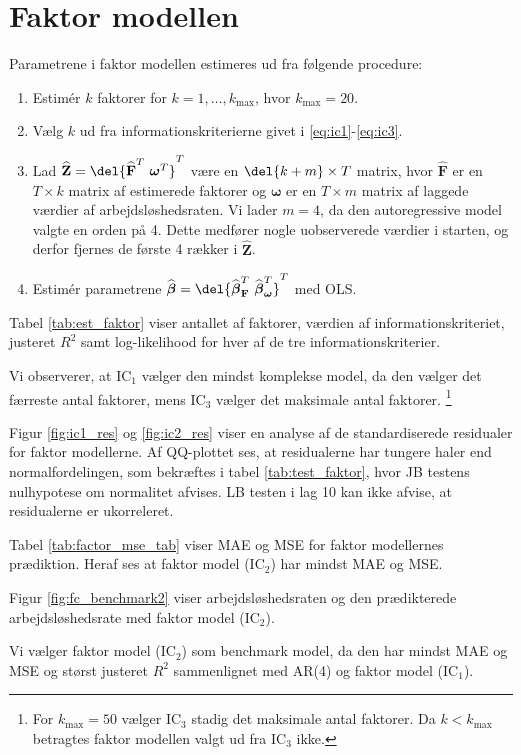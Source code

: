 \section{Faktor modellen}
Parametrene i faktor modellen estimeres ud fra følgende procedure:
\begin{enumerate}
\item Estimér $k$ faktorer for $k = 1, \dots, k_{\max}$, hvor $k_{\max} = 20$.  
\item Vælg $k$ ud fra informationskriterierne givet i \eqref{eq:ic1}-\eqref{eq:ic3}.
\item Lad \(\widehat{\textbf{Z}} = \del{\widehat{{\textbf{F}}}^T \ \boldsymbol{\omega}^T}^T\) være en \(\del{k+m} \times T\) matrix, hvor \(\widehat{{\textbf{F}}}\) er en \(T \times k\) matrix af estimerede faktorer og \(\boldsymbol{\omega}\) er en \(T \times m\) matrix af laggede værdier af arbejdsløshedsraten.
Vi lader \(m = 4\), da den autoregressive model valgte en orden på 4.
Dette medfører nogle uobserverede værdier i starten, og derfor fjernes de første 4 rækker i \(\widehat{\textbf{Z}}\).
\item Estimér parametrene $\widehat{\boldsymbol{\beta}} = \del{ \widehat{\boldsymbol{\beta}}^T_{\textbf{F}} \ \widehat{\boldsymbol{\beta}}^T_{\boldsymbol{\omega}}}^T$ med OLS.
\end{enumerate}

Tabel \ref{tab:est_faktor} viser antallet af faktorer, værdien af informationskriteriet, justeret \(R^2\) samt log-likelihood for hver af de tre informationskriterier. 


Vi observerer, at IC$_1$ vælger den mindst komplekse model, da den vælger det færreste antal faktorer, mens IC$_3$ vælger det maksimale antal faktorer. \footnote{For \(k_\text{max} = 50\) vælger IC\(_3\) stadig det maksimale antal faktorer. Da \(k<k_\text{max}\) betragtes faktor modellen valgt ud fra IC\(_3\) ikke.} 

Figur \ref{fig:ic1_res} og \ref{fig:ic2_res} viser en analyse af de standardiserede residualer for faktor modellerne.
Af QQ-plottet ses, at residualerne har tungere haler end normalfordelingen, som bekræftes i tabel \ref{tab:test_faktor}, hvor JB testens nulhypotese om normalitet afvises.
LB testen i lag 10 kan ikke afvise, at residualerne er ukorreleret.



Tabel \ref{tab:factor_mse_tab} viser MAE og MSE for faktor modellernes prædiktion.
Heraf ses at faktor model (IC\(_2\)) har mindst MAE og MSE.



Figur \ref{fig:fc_benchmark2} viser arbejdsløshedsraten og den prædikterede arbejdsløshedsrate med faktor model (IC\(_2\)).

Vi vælger faktor model (IC\(_2\)) som benchmark model, da den har mindst MAE og MSE og størst justeret \(R^2\) sammenlignet med AR(4) og faktor model (IC\(_1\)).
